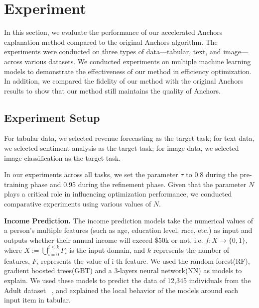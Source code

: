 \section{Experiment}




In this section, we evaluate the performance of our accelerated Anchors explanation method compared to the original Anchors algorithm. The experiments were conducted on three types of data—tabular, text, and image—across various datasets. We conducted experiments on multiple machine learning models to demonstrate the effectiveness of our method in efficiency optimization. 
In addition, we compared the fidelity
of our method with the original Anchors results to show that our method still maintains the quality of Anchors.

\subsection{Experiment Setup}

For tabular data, we selected revenue forecasting as the target task; for text data, we selected sentiment analysis as the target task; for image data, we selected image classification as the target task.

In our experiments across all tasks, we set the parameter \(\tau\) to 0.8 during the pre-training phase and 0.95 during the refinement phase. Given that the parameter \(N\) plays a critical role in influencing optimization performance, we conducted comparative experiments using various values of \(N\). 

\textbf{Income Prediction.} The income prediction models take the numerical values of a person's multiple features (such as age, education level, race, etc.) as input and outputs whether their annual income will exceed \$50k or not, i.e. $f:X \rightarrow{\{0,1\}}$, where $X:=\bigcup_{i=0}^{i\leq k}F_i$ is the input domain, and $k$ represents the number of features, $F_i$ represents the value of i-th feature. We used the random forest(RF), gradient boosted trees(GBT) and a 3-layers neural network(NN) as models to explain. We used these models to predict the data of 12,345 individuals from the Adult dataset ~\cite{adult}, and explained the local behavior of the models around each input item in tabular.

